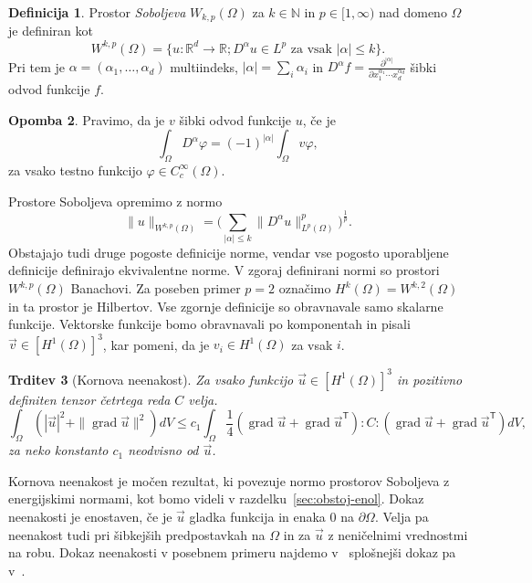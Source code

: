 \documentclass[12pt,a4paper,twoside]{article}
\theoremstyle{definition} %
\newtheorem{definicija}{Definicija}[section]
\newtheorem{opomba}[definicija]{Opomba}
\theoremstyle{plain} %
\newtheorem{trditev}[definicija]{Trditev}
\numberwithin{equation}{section}
\newcommand{\R}{\mathbb R}
\newcommand{\N}{\mathbb N}
\newcommand{\T}{\mathsf{T}}
\newcommand{\grad}{\operatorname{grad}}
\renewcommand{\phi}{\varphi}
\newcommand{\dpar}[2]{\ensuremath{\frac{\partial #1}{\partial #2}}}
\newcommand{\vv}{\vec{v}}
\newcommand{\vu}{\vec{u}}
\begin{document}
\begin{definicija}
  Prostor \emph{Soboljeva} $W_{k,p}(\Omega)$ za $k \in \N$ in $p \in [1,
  \infty)$ nad domeno $\Omega$ je definiran kot
  \[
    W^{k,p}(\Omega) = \{u\colon\R^d\to\R; D^\alpha u \in L^p \text{ za vsak }
    |\alpha| \leq k \}.
  \]
  Pri tem je $\alpha = (\alpha_1, \dots, \alpha_d)$ multiindeks, $|\alpha| =
  \sum_i\alpha_i$ in $D^\alpha f = \dpar{^{|\alpha|}}{x_1^{\alpha_1}\cdots
  x_d^{\alpha_d}}$ šibki odvod funkcije $f$.
\end{definicija}
\begin{opomba}
  Pravimo, da je $v$ šibki odvod funkcije $u$, če je
  \[
    \int_\Omega D^\alpha\phi = (-1)^{|\alpha|}\int_\Omega v \phi,
  \]
  za vsako testno funkcijo $\phi \in C^\infty_c(\Omega)$.
\end{opomba}

Prostore Soboljeva opremimo z normo
\[
\|u\|_{W^{k,p}(\Omega)} = \Big(\sum_{|\alpha| \leq k} \|D^\alpha
u\|_{L^p(\Omega)}^p\Big)^\frac1p.
\]
Obstajajo tudi druge pogoste definicije norme, vendar vse pogosto uporabljene
definicije definirajo ekvivalentne norme. V zgoraj definirani normi so prostori
$W^{k,p}(\Omega)$ Banachovi. Za poseben primer $p = 2$ označimo $H^k(\Omega) =
W^{k,2}(\Omega)$ in ta prostor je Hilbertov.
Vse zgornje definicije so obravnavale samo skalarne funkcije.
Vektorske funkcije bomo obravnavali po komponentah in pisali
$\vv \in [H^1(\Omega)]^3$, kar pomeni, da je $v_i \in H^1(\Omega)$ za vsak $i$.



\begin{trditev}[Kornova neenakost]
  \label{trd:korn}
  Za vsako funkcijo $\vu \in [H^1(\Omega)]^3$ in pozitivno definiten tenzor četrtega reda $C$ velja.
  \[ \int_{\Omega} (|\vu|^2 + \|\grad \vu\|^2) dV \leq c_1 \int_{\Omega}
  \frac14 (\grad \vu + \grad \vu^\T) :C: (\grad \vu + \grad \vu^\T)dV, \]
  za neko konstanto $c_1$ neodvisno od $\vu$.
\end{trditev}
Kornova neenakost je močen rezultat, ki povezuje normo prostorov Soboljeva z
energijskimi normami, kot bomo videli v razdelku~\ref{sec:obstoj-enol}. Dokaz neenakosti je
enostaven, če je $\vu$ gladka funkcija in enaka 0 na $\partial\Omega$. Velja pa neenakost tudi pri
šibkejših predpostavkah na $\Omega$ in za $\vu$ z neničelnimi vrednostmi na robu.
Dokaz neenakosti v posebnem primeru najdemo v~\cite[str.\ 229]{lebedev2009introduction} splošnejši
dokaz pa v~\cite{ciarlet2010korn}.
\end{document}
